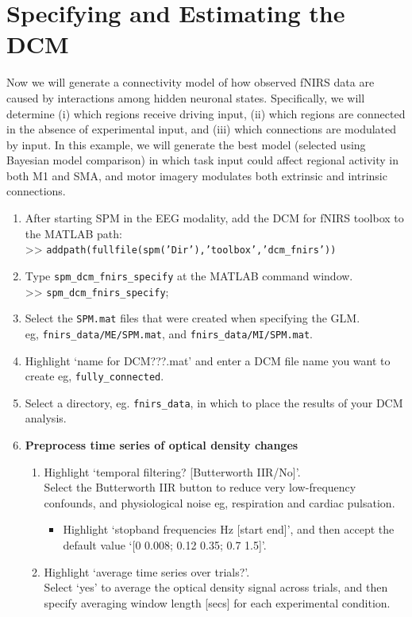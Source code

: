 \section{Specifying and Estimating the DCM}
Now we will generate a connectivity model of how observed fNIRS data are caused by interactions among hidden neuronal states. Specifically, we will determine (i) which regions receive driving input, (ii) which regions are connected in the absence of experimental input, and (iii) which connections are modulated by input. In this example, we will generate the best model (selected using Bayesian model comparison) in which task input could affect regional activity in both M1 and SMA, and motor imagery modulates both extrinsic and intrinsic connections. 

\begin{enumerate} 
\item After starting SPM in the EEG modality, add the DCM for fNIRS toolbox to the MATLAB path:\\
>> \texttt{addpath(fullfile(spm('Dir'),'toolbox','dcm\_fnirs'))}
\item Type \texttt{spm\_dcm\_fnirs\_specify} at the MATLAB command window. \\
>> \texttt{spm\_dcm\_fnirs\_specify};
\item Select the \texttt{SPM.mat} files that were created when specifying the GLM. \\
eg, \texttt{fnirs\_data/ME/SPM.mat}, and \texttt{fnirs\_data/MI/SPM.mat}.
\item Highlight `name for DCM\textunderscore???.mat' and enter a DCM file name you want to create eg, \texttt{fully\_connected}.
\item Select a directory, eg. \texttt{fnirs\_data}, in which to place the results of your DCM analysis.
\item \textbf{Preprocess time series of optical density changes}
\begin{enumerate} 
\item Highlight `temporal filtering? [Butterworth IIR/No]'. \\Select the Butterworth IIR button to reduce very low-frequency confounds, and physiological noise eg, respiration and cardiac pulsation.
\begin{itemize}
\item Highlight `stopband frequencies Hz [start end]', and then accept the default value `[0 0.008; 0.12 0.35; 0.7 1.5]'.
\end{itemize}
\item Highlight `average time series over trials?'. \\Select `yes' to average the optical density signal across trials, and then specify averaging window length [secs] for each experimental condition. 

\end{enumerate}
\end{enumerate}
